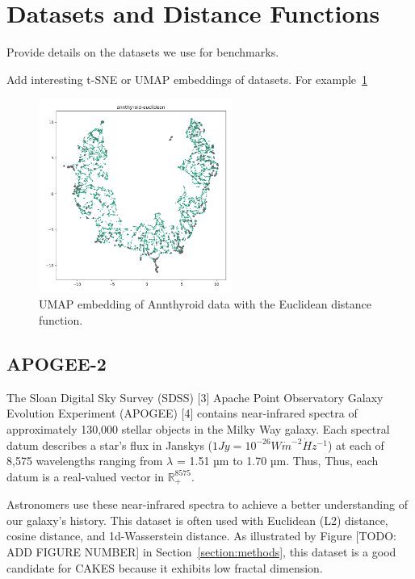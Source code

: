 \section{Datasets and Distance Functions}
\label{sec:datasets-and-distance-functions}

Provide details on the datasets we use for benchmarks.

Add interesting t-SNE or UMAP embeddings of datasets.
For example~\ref{fig:discussion:umap-annthyroid-euclidean}

\begin{figure}[ht!]
    \centering
    \includegraphics[width=2.5in]{images/umaps/annthyroid-euclidean-umap2d.png}
    \caption{UMAP embedding of Annthyroid data with the Euclidean distance function.}
    \label{fig:discussion:umap-annthyroid-euclidean}
\end{figure}

\subsection{APOGEE-2}
\label{subsec:datasets:apogee-2}
The Sloan Digital Sky Survey (SDSS) [3] Apache Point Observatory Galaxy Evolution
Experiment (APOGEE) [4] contains near-infrared
spectra of approximately 130,000 stellar objects in the Milky
Way galaxy. Each spectral datum describes a star's flux in
Janskys ($1 Jy = 10^{-26} W \dot m^{-2} \dot Hz^{-1}$) at each of 8,575 wavelengths ranging from $\lambda$ = 1.51 µm to 1.70 µm. Thus,
Thus, each datum is a real-valued vector in $\mathbb{R}_{+}^{8575}$. 

Astronomers use these near-infrared spectra to achieve a better understanding of our galaxy's history. This dataset 
is often used with Euclidean (L2) distance, cosine distance, and 1d-Wasserstein distance. As illustrated by Figure [TODO: ADD FIGURE NUMBER] in Section~\ref{section:methods},
this dataset is a good candidate for CAKES because it exhibits low fractal dimension. 

